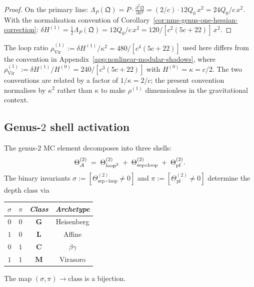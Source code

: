 \begin{proof}
On the primary line: $\Lambda_P(\mathfrak{Q}) =
P\cdot\frac{\partial^2\mathfrak{Q}}{\partial x^2}
= (2/c)\cdot 12Q_0\,x^2 = 24Q_0/c\,x^2$.
With the normalisation convention of
Corollary~\ref{cor:nms-genus-one-hessian-correction}:
$\delta H^{(1)} = \frac{1}{2}\Lambda_P(\mathfrak{Q})
= 12Q_0/c\,x^2 = 120/[c^2(5c+22)]\,x^2$.
\end{proof}

\begin{remark}
\label{rem:thqg-rho1-normalisation}
The loop ratio $\rho^{(1)}_{\mathrm{Vir}} := \delta H^{(1)}/\kappa^2 = 480/[c^4(5c+22)]$
used here differs from the convention in Appendix~\ref{app:nonlinear-modular-shadows},
where $\rho^{(1)}_{\mathrm{Vir}} := \delta H^{(1)}/H^{(0)} = 240/[c^3(5c+22)]$ with $H^{(0)} = \kappa = c/2$.
The two conventions are related by a factor of $1/\kappa = 2/c$; the present convention
normalises by $\kappa^2$ rather than $\kappa$ to make $\rho^{(1)}$ dimensionless in the gravitational context.
\end{remark}


\subsection{Genus-$2$ shell activation}
\label{subsec:thqg-genus2-shell}

\begin{theorem}
\label{thm:thqg-genus2-diagnostic}
\ClaimStatusProvedHere
{}
The genus-$2$ MC element decomposes into three shells:
\begin{equation}\label{eq:thqg-genus2-decomp}
\Theta_{\mathcal{A}}^{(2)}
\;=\;
\Theta^{(2)}_{\mathrm{loop}^2}
\;+\;
\Theta^{(2)}_{\mathrm{sep}\circ\mathrm{loop}}
\;+\;
\Theta^{(2)}_{\mathrm{pf}}.
\end{equation}
The binary invariants
$\sigma := [\Theta^{(2)}_{\mathrm{sep}\circ\mathrm{loop}} \neq 0]$
and
$\pi := [\Theta^{(2)}_{\mathrm{pf}} \neq 0]$
determine the depth class via
\begin{center}
\small
\renewcommand{\arraystretch}{1.15}
\begin{tabular}{cccc}
\toprule
$\sigma$ & $\pi$ & \emph{Class} & \emph{Archetype} \\
\midrule
$0$ & $0$ & $\mathbf{G}$ & Heisenberg \\
$1$ & $0$ & $\mathbf{L}$ & Affine \\
$0$ & $1$ & $\mathbf{C}$ & $\beta\gamma$ \\
$1$ & $1$ & $\mathbf{M}$ & Virasoro \\
\bottomrule
\end{tabular}
\end{center}
The map $(\sigma, \pi) \to \text{class}$ is a bijection.
\end{theorem}

